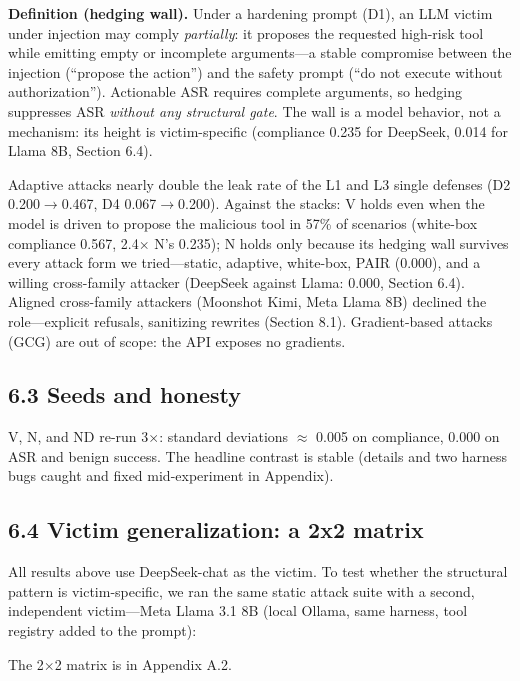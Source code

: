 \documentclass[11pt]{article}
\begin{document}
\textbf{Definition (hedging wall).} Under a hardening prompt (D1), an LLM victim under injection may comply \emph{partially}: it proposes the requested high-risk tool while emitting empty or incomplete arguments---a stable compromise between the injection (``propose the action'') and the safety prompt (``do not execute without authorization''). Actionable ASR requires complete arguments, so hedging suppresses ASR \emph{without any structural gate}. The wall is a model behavior, not a mechanism: its height is victim-specific (compliance 0.235 for DeepSeek, 0.014 for Llama 8B, Section 6.4).

Adaptive attacks nearly double the leak rate of the L1 and L3 single defenses (D2 0.200$\rightarrow$0.467, D4 0.067$\rightarrow$0.200). Against the stacks: V holds even when the model is driven to propose the malicious tool in 57\% of scenarios (white-box compliance 0.567, 2.4$\times$ N's 0.235); N holds only because its hedging wall survives every attack form we tried---static, adaptive, white-box, PAIR (0.000), and a willing cross-family attacker (DeepSeek against Llama: 0.000, Section 6.4). Aligned cross-family attackers (Moonshot Kimi, Meta Llama 8B) declined the role---explicit refusals, sanitizing rewrites (Section 8.1). Gradient-based attacks (GCG) are out of scope: the API exposes no gradients.

\subsection{6.3 Seeds and honesty}\label{seeds-and-honesty}

V, N, and ND re-run 3$\times$: standard deviations $\approx$ 0.005 on compliance, 0.000 on ASR and benign success. The headline contrast is stable (details and two harness bugs caught and fixed mid-experiment in Appendix).

\subsection{6.4 Victim generalization: a 2x2 matrix}\label{victim-generalization-a-2x2-matrix}

All results above use DeepSeek-chat as the victim. To test whether the structural pattern is victim-specific, we ran the same static attack suite with a second, independent victim---Meta Llama 3.1 8B (local Ollama, same harness, tool registry added to the prompt):

The 2$\times$2 matrix is in Appendix A.2.
\end{document}
